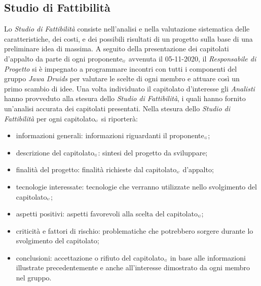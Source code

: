 \subsection{Studio di Fattibilità}\label{ProcessiPrimariFornituraStudioDiFattibilità}
Lo \textit{Studio di Fattibilità} consiste nell'analisi e nella valutazione sistematica delle caratteristiche, dei costi, e dei possibili risultati di un progetto sulla base di una preliminare idea di massima.
A seguito della presentazione dei capitolati d'appalto da parte di ogni proponente$_{\scaleto{G}{3pt}}$ avvenuta il 05-11-2020, il \textit{Responsabile di Progetto} si è impegnato a programmare incontri con tutti i componenti del gruppo \textit{Jawa Druids} per valutare le scelte di ogni membro e attuare così un primo scambio di idee. Una volta individuato il capitolato d'interesse gli \textit{Analisti} hanno provveduto alla stesura dello \textit{Studio di Fattibilità}, i quali hanno fornito un'analisi accurata dei capitolati presentati.
Nella stesura dello \textit{Studio di Fattibilità} per ogni capitolato$_{\scaleto{G}{3pt}}$ si riporterà:
\begin{itemize}
	\item informazioni generali: informazioni riguardanti il proponente$_{\scaleto{G}{3pt}}$;
	\item descrizione del capitolato$_{\scaleto{G}{3pt}}$: sintesi del progetto da sviluppare; 
	\item finalità del progetto: finalità richieste dal capitolato$_{\scaleto{G}{3pt}}$ d'appalto;
	\item tecnologie interessate: tecnologie che verranno utilizzate nello svolgimento del capitolato$_{\scaleto{G}{3pt}}$;
	\item aspetti positivi: aspetti favorevoli alla scelta del capitolato$_{\scaleto{G}{3pt}}$;
	\item criticità e fattori di rischio: problematiche che potrebbero sorgere durante lo svolgimento del capitolato;
	\item conclusioni: accettazione o rifiuto del capitolato$_{\scaleto{G}{3pt}}$ in base alle informazioni illustrate precedentemente e anche all'interesse dimostrato da ogni membro nel gruppo.
\end{itemize}

